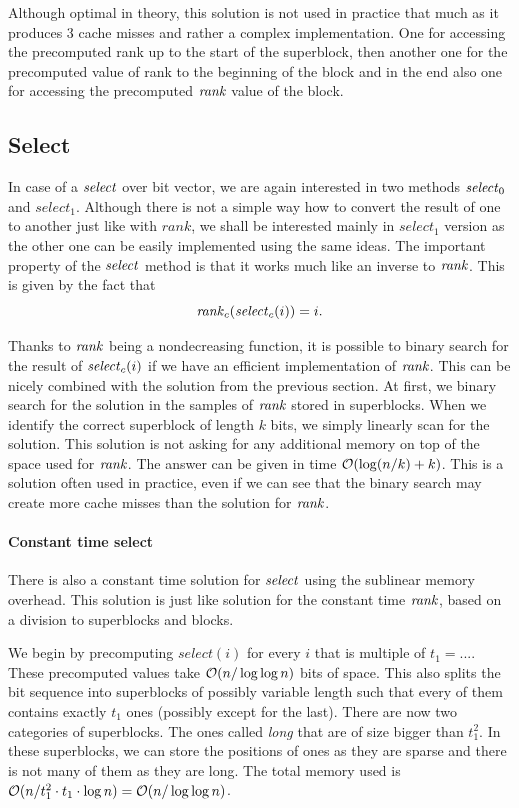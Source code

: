 Although optimal in theory, this solution is not used in practice that much as it produces
3 cache misses and rather a complex implementation. One for accessing the precomputed rank up
to the start of the superblock, then another one for the precomputed value of rank to the
beginning of the block and in the end also one for accessing the precomputed $\mathit{rank}$ value
of the block.


\subsection{Select}
\label{section:select}

In case of a $\mathit{select}$ over bit vector, we are again interested in two methods $\mathit{select}_0$
and $select_1$. Although there is not a simple way how to convert the result of one to
another just like with $rank$, we shall be interested mainly in $select_1$ version as the
other one can be easily implemented using the same ideas. The important property of the
$\mathit{select}$ method is that it works much like an inverse to $\mathit{rank}$. This is given by the fact that
$$\mathit{rank}_c(\mathit{select}_c(i)) = i.$$

Thanks to $\mathit{rank}$ being a nondecreasing function, it is possible
to binary search for the result of $\mathit{select}_c(i)$ if we have an efficient implementation of
$\mathit{rank}$. This can be nicely combined with the solution from the previous section.
At first, we binary search for the solution in the samples of $\mathit{rank}$ stored in superblocks. When we
identify the correct superblock of length $k$ bits, we simply linearly scan for the solution. This
solution is not asking for any additional memory on top of the space used for $\mathit{rank}$. The answer
can be given in time $\mathcal{O}(\log(n/k)+k)$. This is a solution often used in practice, even if we
can see that the binary search may create more cache misses than the solution for $\mathit{rank}$.

\paragraph{Constant time select}

There is also a constant time solution for $\mathit{select}$ using the sublinear memory overhead.
This solution is just like solution for the constant time $\mathit{rank}$, based on a division
to superblocks and blocks.

We begin by precomputing $select(i)$ for every $i$ that is
multiple of $t_1=...$. These precomputed values take $\mathcal{O}(n/\log\log n)$ bits of space.
This also splits the bit sequence into superblocks of possibly variable length such that
every of them contains exactly $t_1$ ones (possibly except for the last). There are
now two categories of superblocks. The ones called \textit{long} that are of size bigger
than $t_1^2$. In these superblocks, we can store the positions of ones as they are sparse
and there is not many of them as they are long. The total memory used is $\mathcal{O}(n/t_1^2\cdot t_1\cdot
\log n) = \mathcal{O}(n/\log\log n)$.


